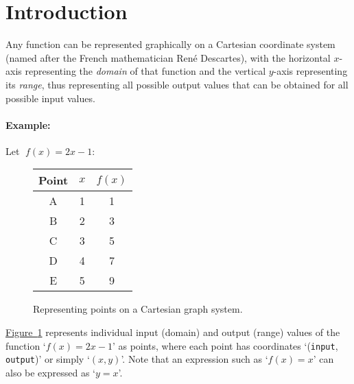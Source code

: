 \documentclass[a5paper,9pt]{book}
\theoremstyle{definition}
\newcommand{\fig}[2]{%
    \hyperref[#2]{#1~\ref*{#2}}%
}
\begin{document}
        \section{Introduction}\label{sec:graphic_functions_introduction}

        Any function can be represented graphically on a Cartesian coordinate system
        (named after the French mathematician Ren\'{e} Descartes),
        with the horizontal $x$-axis representing the \emph{domain} of that function
        and the vertical $y$-axis representing its \emph{range}, thus representing all
        possible output values that can be obtained for all possible input values.

        \paragraph{Example:} Let $\;f(x)= 2x - 1$:

        \begin{figure}[ht]
            \centering
        \begin{minipage}{0.3\textwidth}
            \centering
            \begin{tabular}{ccc}
                \toprule
                \textbf{Point} & $x$ & $f(x)$ \\
                \midrule
                A & 1 & 1 \\
                B & 2 & 3 \\
                C & 3 & 5 \\
                D & 4 & 7 \\
                E & 5 & 9 \\
                \bottomrule
            \end{tabular}
        \end{minipage}
        \hspace{15pt}
        \begin{minipage}{0.6\textwidth}
            \centering
            
        \end{minipage}
        \caption{Representing points on a Cartesian graph system.}%
        \label{fig:points_on_cartesian_graph}
        \end{figure}


        \fig{Figure}{fig:points_on_cartesian_graph} represents individual input (domain)
        and output (range) values of the function `$f(x) = 2x-1$' as points, where each point
        has coordinates `(\texttt{input}, \texttt{output})' or simply `$(x,y)$'.
        Note that an expression such as `$f(x)=x$' can also be expressed as `$y=x$'.
\end{document}

